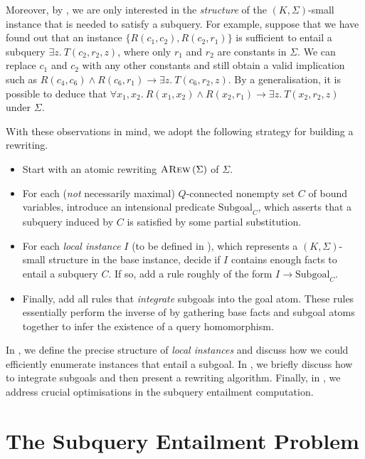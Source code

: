 \documentclass[12pt]{report}
\theoremstyle{plain}
\theoremstyle{definition}
\newcommand{\ARew}[1]{\ensuremath{\normalfont{\textsc{ARew}} \left( #1 \right)}}
\begin{document}
Moreover, by , we are only interested in the \emph{structure} of the $(K, \Sigma)$-small instance that is needed to satisfy a subquery. For example, suppose that we have found out that an instance $\{R(c_1, c_2), R(c_2, r_1)\}$ is sufficient to entail a subquery $\exists z.\ T(c_2, r_2, z)$, where only $r_1$ and $r_2$ are constants in $\Sigma$. We can replace $c_1$ and $c_2$ with any other constants and still obtain a valid implication such as $R(c_4, c_6) \wedge R(c_6, r_1) \rightarrow \exists z.\ T(c_6, r_2, z)$. By a generalisation, it is possible to deduce that $\forall x_1, x_2.\ R(x_1, x_2) \wedge R(x_2, r_1) \rightarrow \exists z.\ T(x_2, r_2, z)$ under $\Sigma$.

With these observations in mind, we adopt the following strategy for building a rewriting.

\begin{itemize}
  \item Start with an atomic rewriting $\ARew{\Sigma}$ of $\Sigma$.
  \item For each (\emph{not} necessarily maximal) $Q$-connected nonempty set $C$ of bound variables, introduce an intensional predicate $\mathrm{Subgoal}_C$, which asserts that a subquery induced by $C$ is satisfied by some partial substitution.
  \item For each \emph{local instance} $I$ (to be defined in ), which represents a $(K, \Sigma)$-small structure in the base instance, decide if $I$ contains enough facts to entail a subquery $C$. If so, add a rule roughly of the form $I \rightarrow \mathrm{Subgoal}_C$.
  \item Finally, add all rules that \emph{integrate} subgoals into the goal atom. These rules essentially perform the inverse of  by gathering base facts and subgoal atoms together to infer the existence of a query homomorphism.
\end{itemize}

In , we define the precise structure of \emph{local instances} and discuss how we could efficiently enumerate instances that entail a subgoal. In , we briefly discuss how to integrate subgoals and then present a rewriting algorithm. Finally, in , we address crucial optimisations in the subquery entailment computation.

\section{The Subquery Entailment Problem}
\label{subquery-entailment-problem-section}
\end{document}
